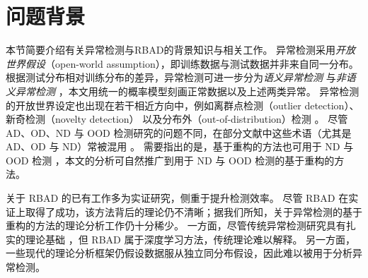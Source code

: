 

\section{问题背景}\label{rbad: related-work}

本节简要介绍有关异常检测与RBAD的背景知识与相关工作。
异常检测采用\emph{开放世界假设}（open-world assumption），即训练数据与测试数据并非来自同一分布。
根据测试分布相对训练分布的差异，异常检测可进一步分为\emph{语义异常检测} \citep{DBLP:conf/aaai/AhmedC20,DBLP:conf/icml/DeeckeRVB21} 与\emph{非语义异常检测} \citep{DBLP:journals/ijcv/BergmannBFSS21,DBLP:journals/corr/abs-2305-15956}，本文用统一的概率模型刻画正常数据以及上述两类异常。
异常检测的开放世界设定也出现在若干相近方向中，例如离群点检测（outlier detection）\citep{DBLP:journals/access/WangBH19}、新奇检测（novelty detection）\citep{DBLP:journals/sigpro/PimentelCCT14} 以及分布外（out-of-distribution）检测 \citep{DBLP:conf/cvpr/GrahamPTNOC23}。
尽管 AD、OD、ND 与 OOD 检测研究的问题不同，在部分文献中这些术语（尤其是 AD、OD 与 ND）常被混用 \citep{DBLP:journals/pieee/RuffKVMSKDM21,DBLP:journals/csur/PangSCH21}。
需要指出的是，基于重构的方法也可用于 ND \citep{DBLP:conf/nips/PidhorskyiAD18,DBLP:conf/cvpr/PereraNX19} 与 OOD 检测 \citep{DBLP:conf/cvpr/Zhou22}，本文的分析可自然推广到用于 ND 与 OOD 检测的基于重构的方法。

关于 RBAD 的已有工作多为实证研究，侧重于提升检测效率。
尽管 RBAD 在实证上取得了成功，该方法背后的理论仍不清晰；据我们所知，关于异常检测的基于重构的方法的理论分析工作仍十分稀少。
一方面，尽管传统异常检测研究具有扎实的理论基础 \citep{DBLP:journals/csur/ChandolaBK09}，但 RBAD 属于深度学习方法，传统理论难以解释。
另一方面，一些现代的理论分析框架仍假设数据服从独立同分布假设，因此难以被用于分析异常检测。



